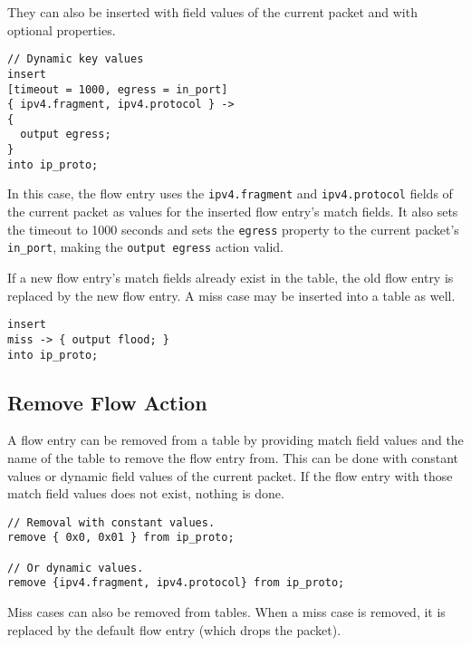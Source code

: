 They can also be inserted with field values of the current packet and with
optional properties.

\begin{codepage}
\begin{lstlisting}
// Dynamic key values
insert
[timeout = 1000, egress = in_port]
{ ipv4.fragment, ipv4.protocol } ->
{
  output egress;
}
into ip_proto;
\end{lstlisting}
\end{codepage}

In this case, the flow entry uses the \texttt{ipv4.fragment} and \texttt{ipv4.protocol}
fields of the current packet as values for the inserted flow entry's match fields.
It also sets the timeout to 1000 seconds and sets the \texttt{egress} property to the
current packet's \texttt{in\_port}, making the \texttt{output egress} action
valid.

If a new flow entry's match fields already exist in the table, the old flow
entry is replaced by the new flow entry. A miss case may be inserted into a
table as well.

\begin{codepage}
\begin{lstlisting}
insert
miss -> { output flood; }
into ip_proto;
\end{lstlisting}
\end{codepage}

\subsection{Remove Flow Action} \label{tut:remove_flow_action}

A flow entry can be removed from a table by providing match field values and the
name of the table to remove the flow entry from. This can be done with constant
values or dynamic field values of the current packet. If the flow entry with
those match field values does not exist, nothing is done.

\begin{codepage}
\begin{lstlisting}
// Removal with constant values.
remove { 0x0, 0x01 } from ip_proto;

// Or dynamic values.
remove {ipv4.fragment, ipv4.protocol} from ip_proto;
\end{lstlisting}
\end{codepage}

Miss cases can also be removed from tables. When a miss case is removed, it is
replaced by the default flow entry (which drops the packet).

